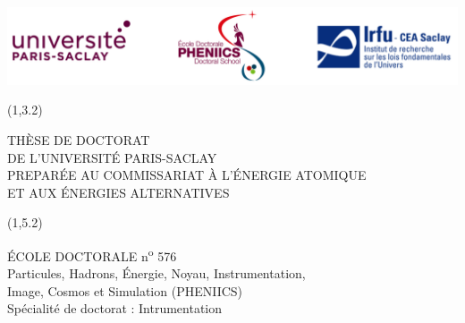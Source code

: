 
\chapter*{}
\thispagestyle{empty}

\usetikzlibrary{calc}
\thispagestyle{empty}


\begin{center}
	\vspace{-6.5cm}
	\includegraphics[width=14cm]{00_Guards/Logos/Logo_ALL2.png}\\
	\vspace{1cm}
\end{center}

\begin{textblock}{14}(1,3.2)
	\begin{center}
		\textcolor{blue!20!red!45!black!75!}
		{\uppercase{\Large Thèse de Doctorat \\ de L'Université Paris-Saclay \\ Preparée au Commissariat à l'Énergie atomique\\ et aux Énergies alternatives}}
	\end{center}
\end{textblock}

\begin{textblock}{14}(1,5.2)
	\begin{center}
		\large
		\uppercase{école doctorale}	 n\textsuperscript{o} 576 \\
		Particules, Hadrons, \'{E}nergie, Noyau, Instrumentation, \\Image, Cosmos et Simulation (PHENIICS)\\
		Spécialité de doctorat : Intrumentation
	\end{center}
\end{textblock}



